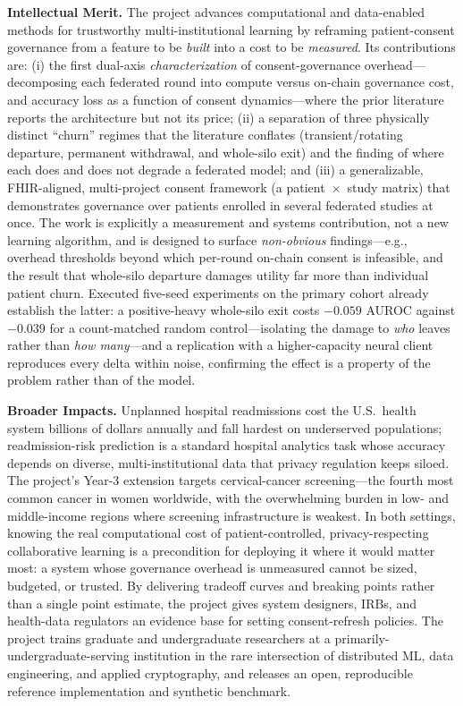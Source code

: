 \documentclass[11pt]{article}
\begin{document}
\medskip
\noindent\textbf{Intellectual Merit.}
The project advances computational and data-enabled methods for trustworthy
multi-institutional learning by reframing patient-consent governance from a
feature to be \emph{built} into a cost to be \emph{measured}. Its contributions
are: (i) the first dual-axis \emph{characterization} of consent-governance
overhead---decomposing each federated round into compute versus on-chain
governance cost, and accuracy loss as a function of consent dynamics---where the
prior literature reports the architecture but not its price; (ii) a separation of
three physically distinct ``churn'' regimes that the literature conflates
(transient/rotating departure, permanent withdrawal, and whole-silo exit) and
the finding of where each does and does not degrade a federated model; and (iii)
a generalizable, FHIR-aligned, multi-project consent framework (a
patient~$\times$~study matrix) that demonstrates governance over patients
enrolled in several federated studies at once. The work is explicitly a
measurement and systems contribution, not a new learning algorithm, and is
designed to surface \emph{non-obvious} findings---e.g., overhead thresholds
beyond which per-round on-chain consent is infeasible, and the result that
whole-silo departure damages utility far more than individual patient churn.
Executed five-seed experiments on the primary cohort already establish the
latter: a positive-heavy whole-silo exit costs $-0.059$ AUROC against $-0.039$
for a count-matched random control---isolating the damage to \emph{who} leaves
rather than \emph{how many}---and a replication with a higher-capacity neural
client reproduces every delta within noise, confirming the effect is a property
of the problem rather than of the model.

\medskip
\noindent\textbf{Broader Impacts.}
Unplanned hospital readmissions cost the U.S.\ health system billions of dollars
annually and fall hardest on underserved populations; readmission-risk
prediction is a standard hospital analytics task whose accuracy depends on
diverse, multi-institutional data that privacy regulation keeps siloed. The
project's Year-3 extension targets cervical-cancer screening---the fourth most
common cancer in women worldwide, with the overwhelming burden in low- and
middle-income regions where screening infrastructure is weakest. In both
settings, knowing the real computational cost of
patient-controlled, privacy-respecting collaborative learning is a precondition
for deploying it where it would matter most: a system whose governance overhead
is unmeasured cannot be sized, budgeted, or trusted. By delivering tradeoff
curves and breaking points rather than a single point estimate, the project gives
system designers, IRBs, and health-data regulators an evidence base for setting
consent-refresh policies. The project trains graduate and undergraduate
researchers at a primarily-undergraduate-serving institution in the rare
intersection of distributed ML, data engineering, and applied cryptography, and
releases an open, reproducible reference implementation and synthetic benchmark.
\end{document}

